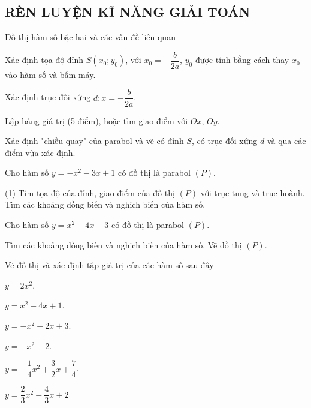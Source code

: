 \subsection{RÈN LUYỆN KĨ NĂNG GIẢI TOÁN}
\begin{dang}{Đồ thị hàm số bậc hai và các vấn đề liên quan}
	\begin{listEX}[1]
		\item [\ding{172}] Xác định tọa độ đỉnh $S(x_0;y_0)$, với $x_0=-\dfrac{b}{2a}$, $y_0$ được tính bằng cách thay $x_0$ vào hàm số và bấm máy.
		\item [\ding{173}] Xác định trục đối xứng $d \colon x=-\dfrac{b}{2a}$.
		\item [\ding{174}] Lập bảng giá trị (5 điểm), hoặc tìm giao điểm với $Ox$, $Oy$.
		\item [\ding{175}] Xác định "chiều quay" của parabol và vẽ  có đỉnh $S$, có trục đối xứng $d$ và qua các điểm vừa xác định. 
	\end{listEX}
\end{dang}

\begin{vd}%
	Cho hàm số $y=-x^2-3x+1$ có đồ thị là parabol $(P)$. 
	\begin{tasks}(1)
		\task Tìm tọa độ của đỉnh, giao điểm của đồ thị $(P)$ với trục tung và trục hoành.
		\task Tìm các khoảng đồng biến và nghịch biến của hàm số.
	\end{tasks}
\end{vd}
\begin{vd}%
	Cho hàm số $y=x^2-4x+3$ có đồ thị là parabol $(P)$. 
	\begin{tasks}
		\task Tìm các khoảng đồng biến và nghịch biến của hàm số. 
		\task Vẽ đồ thị $(P)$.
	\end{tasks}
\end{vd}

\begin{vd}
	Vẽ đồ thị và xác định tập giá trị của các hàm số sau đây
	\begin{listEX}[3]
		\item $y=2x^2$.
		\item $y=x^2-4x+1$.
		\item $y=-x^2-2x+3$.
		\item $y=-x^2-2$.
		\item $y=-\dfrac{1}{4}x^2+\dfrac{3}{2}x+\dfrac{7}{4}$.
		\item $y=\dfrac{2}{3}x^2-\dfrac{4}{3}x+2$.
	\end{listEX}
\end{vd}

